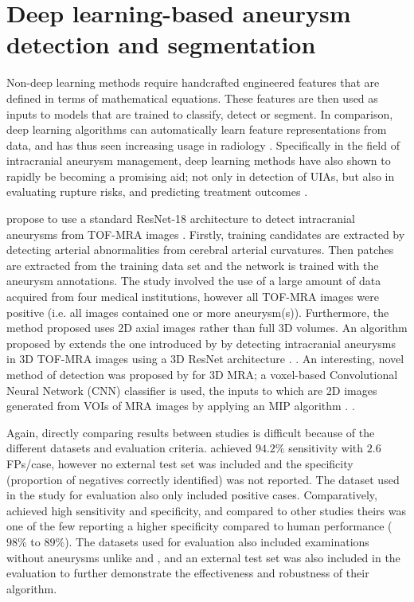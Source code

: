 
\section{Deep learning-based aneurysm detection and segmentation}
Non-deep learning methods require handcrafted engineered features that are defined in terms of mathematical equations. These features are then used as inputs to models that are trained to classify, detect or segment. In comparison, deep learning algorithms can automatically learn feature representations from data, and has thus seen increasing usage in radiology \cite{Hosny2018}. Specifically in the field of intracranial aneurysm management, deep learning methods have also shown to rapidly be becoming a promising aid; not only in detection of UIAs, but also in evaluating rupture risks, and predicting treatment outcomes \cite{Shi2020}.

\citeauthor{Ueda2019} propose to use a standard ResNet-18 architecture to detect intracranial aneurysms from TOF-MRA images \cite{He2016, Ueda2019}. Firstly, training candidates are extracted by detecting arterial abnormalities from cerebral arterial curvatures. Then patches are extracted from the training data set and the network is trained with the aneurysm annotations. The study involved the use of a large amount of data acquired from four medical institutions, however all TOF-MRA images were positive (i.e. all images contained one or more aneurysm(s)). Furthermore, the method proposed uses 2D axial images rather than full 3D volumes. An algorithm proposed by \citeauthor{Joo2020} extends the one introduced by \citeauthor{Ueda2019} by detecting intracranial aneurysms in 3D TOF-MRA images using a 3D ResNet architecture \cite{He2016, Joo2020}. . An interesting, novel method of detection was proposed by \citeauthor{Nakao2018} for 3D MRA; a voxel-based Convolutional Neural Network (CNN) classifier is used, the inputs to which are 2D images generated from VOIs of MRA images by applying an MIP algorithm \cite{Nakao2018}. . 

Again, directly comparing results between studies is difficult because of the different datasets and evaluation criteria. \citeauthor{Nakao2018} achieved $94.2\%$ sensitivity with $2.6$ FPs/case, however no external test set was included and the specificity (proportion of negatives correctly identified) was not reported. The dataset used in the study for evaluation also only included positive cases. Comparatively, \citeauthor{Joo2020} achieved high sensitivity and specificity, and compared to other studies theirs was one of the few reporting a higher specificity compared to human performance ($98\%$ to $89\%$). The datasets used for evaluation also included examinations without aneurysms unlike \citeauthor{Ueda2019} and \citeauthor{Nakao2018}, and an external test set was also included in the evaluation to further demonstrate the effectiveness and robustness of their algorithm.

